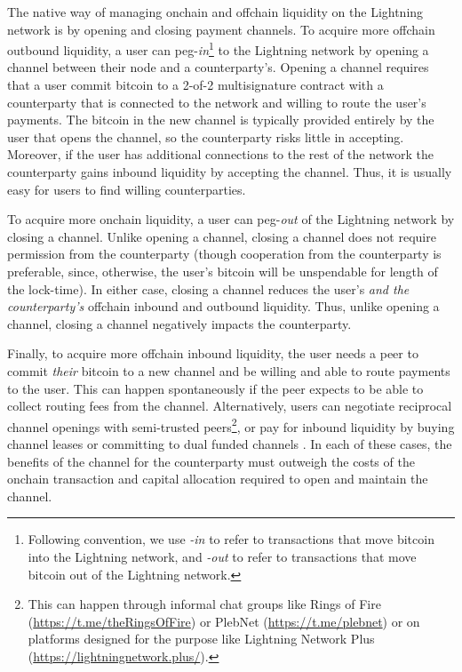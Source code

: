 \documentclass[10pt,twocolumn]{article}
\begin{document}
The native way of managing onchain and offchain liquidity
on the Lightning network
is by opening and closing payment channels.
To acquire more offchain outbound liquidity,
a user can peg-\emph{in}\footnote{
	Following convention, we use \emph{-in} to refer to transactions
	that move bitcoin into the Lightning network,
	and \emph{-out} to refer to transactions that move bitcoin
	out of the Lightning network.
}
to the Lightning network by opening a channel
between their node and a counterparty's.
Opening a channel requires that a user
commit bitcoin to a 2-of-2 multisignature contract
with a counterparty that is connected to the network and
willing to route the user's payments.
The bitcoin in the new channel is typically provided
entirely by the user that opens the channel,
so the counterparty risks little in accepting.
Moreover, if the user has additional connections to the rest of the network
the counterparty gains inbound liquidity by accepting the channel.
Thus, it is usually easy for users to find willing counterparties.

To acquire more onchain liquidity,
a user can peg-\emph{out} of the Lightning network by closing a channel.
Unlike opening a channel, closing a channel does not require permission
from the counterparty
(though cooperation from the counterparty is preferable,
since, otherwise, the user's bitcoin will be unspendable for length of the lock-time).
In either case, closing a channel reduces the user's \emph{and the counterparty's}
offchain inbound and outbound liquidity.
Thus, unlike opening a channel,
closing a channel negatively impacts the counterparty.

Finally, to acquire more offchain inbound liquidity,
the user needs a peer to commit \emph{their} bitcoin to a new channel
and be willing and able to route payments to the user.
This can happen spontaneously
if the peer expects to be able to collect routing fees from the channel.
Alternatively, users can negotiate reciprocal channel openings
with semi-trusted peers\footnote{
	This can happen
	through informal chat groups like Rings of Fire (\url{https://t.me/theRingsOfFire})
	or PlebNet (\url{https://t.me/plebnet})
	or on platforms designed for the purpose
	like Lightning Network Plus (\url{https://lightningnetwork.plus/}).
},
or pay for inbound liquidity by buying channel leases or committing to dual funded channels
\citep{osuntokun2020, neigut2018}.
In each of these cases, the benefits of the channel for the counterparty must outweigh
the costs of the onchain transaction and capital allocation required to open and maintain the channel.
\end{document}
